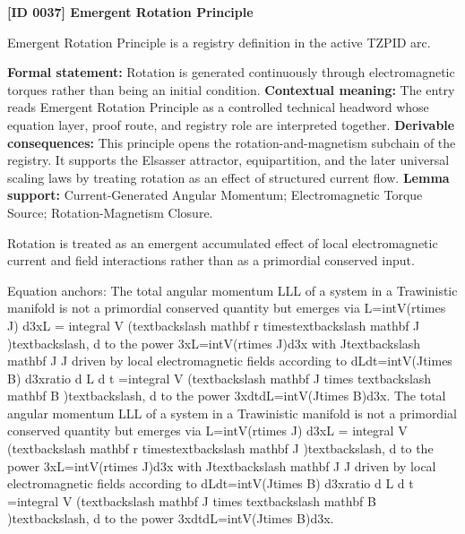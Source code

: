 \clearpage
\noindent\textbf{[ID 0037] Emergent Rotation Principle}\par
\vspace{0.35em}
\begingroup\small
{}
Emergent Rotation Principle is a registry definition in the active TZPID arc.

\begingroup\footnotesize\setlength{\emergencystretch}{3em}\sloppy
\textbf{Formal statement:} Rotation is generated continuously through electromagnetic torques rather than being an initial condition. \textbf{Contextual meaning:} The entry reads Emergent Rotation Principle as a controlled technical headword whose equation layer, proof route, and registry role are interpreted together. \textbf{Derivable consequences:} This principle opens the rotation-and-magnetism subchain of the registry. It supports the Elsasser attractor, equipartition, and the later universal scaling laws by treating rotation as an effect of structured current flow. \textbf{Lemma support:} Current-Generated Angular Momentum; Electromagnetic Torque Source; Rotation-Magnetism Closure.\par
\endgroup

Rotation is treated as an emergent accumulated effect of local electromagnetic current and field interactions rather than as a primordial conserved input.

Equation anchors: The total angular momentum LLL of a system in a Trawinistic manifold is not a primordial conserved quantity but emerges via L=intV(rtimes J) d3xL = integral V (textbackslash mathbf r timestextbackslash mathbf J )textbackslash, d to the power 3xL=intV(rtimes J)d3x with Jtextbackslash mathbf J J driven by local electromagnetic fields according to dLdt=intV(Jtimes B) d3xratio d L d t =integral V (textbackslash mathbf J times textbackslash mathbf B )textbackslash, d to the power 3xdtdL=intV(Jtimes B)d3x. The total angular momentum LLL of a system in a Trawinistic manifold is not a primordial conserved quantity but emerges via L=intV(rtimes J) d3xL = integral V (textbackslash mathbf r timestextbackslash mathbf J )textbackslash, d to the power 3xL=intV(rtimes J)d3x with Jtextbackslash mathbf J J driven by local electromagnetic fields according to dLdt=intV(Jtimes B) d3xratio d L d t =integral V (textbackslash mathbf J times textbackslash mathbf B )textbackslash, d to the power 3xdtdL=intV(Jtimes B)d3x.

